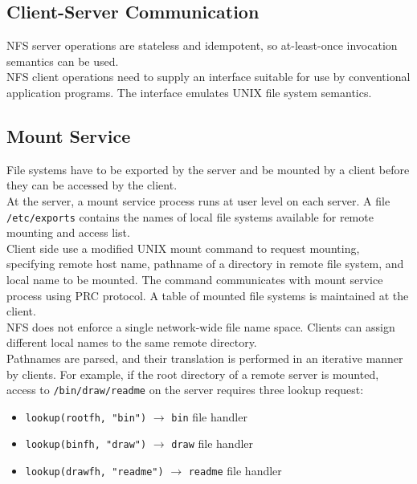 \begin{multicols*}{2}
\subsection{Client-Server Communication}

\noindent NFS server operations are stateless and idempotent, so at-least-once invocation semantics can be used.\\

\noindent NFS client operations need to supply an interface suitable for use by conventional application programs. The interface emulates UNIX file system semantics. \\

\subsection{Mount Service}

\noindent File systems have to be exported by the server and be mounted by a client before they can be accessed by the client.\\

\noindent At the server, a mount service process runs at user level on each server. A file \verb|/etc/exports| contains the names of local file systems available for remote mounting and access list. \\

\noindent Client side use a modified UNIX mount command to request mounting, specifying remote host name, pathname of a directory in remote file system, and local name to be mounted. The command communicates with mount service process using PRC protocol. A table of mounted file systems is maintained at the client.\\

\noindent NFS does not enforce a single network-wide file name space. Clients can assign different local names to the same remote directory.\\

\noindent Pathnames are parsed, and their translation is performed in an iterative manner by clients. For example, if the root directory of a remote server is mounted, access to \verb|/bin/draw/readme| on the server requires three lookup request:
\begin{itemize}
    \item \verb|lookup(rootfh, "bin")| $\rightarrow$ \verb|bin| file handler
    \item \verb|lookup(binfh, "draw")| $\rightarrow$ \verb|draw| file handler
    \item \verb|lookup(drawfh, "readme")| $\rightarrow$ \verb|readme| file handler
\end{itemize}


\end{multicols*}
